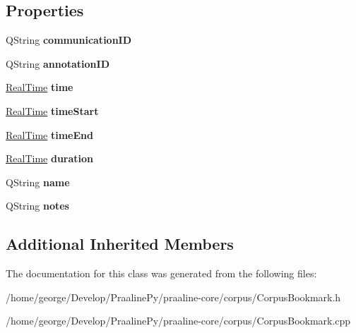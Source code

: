 \subsection*{Properties}
\begin{DoxyCompactItemize}
\item 
\mbox{\label{class_corpus_bookmark_abcd77d7fb97ddd29000918432704e12a}} 
Q\+String {\bfseries communication\+ID}
\item 
\mbox{\label{class_corpus_bookmark_a7c73ec0ea43dc8ede1cab7b6ec4c66fd}} 
Q\+String {\bfseries annotation\+ID}
\item 
\mbox{\label{class_corpus_bookmark_afdd695b8d2efd769c3812bc6536067a1}} 
\hyperlink{struct_real_time}{Real\+Time} {\bfseries time}
\item 
\mbox{\label{class_corpus_bookmark_a720543df1f873fc01f3f00ae17372492}} 
\hyperlink{struct_real_time}{Real\+Time} {\bfseries time\+Start}
\item 
\mbox{\label{class_corpus_bookmark_a9a32bab6289a02166c462a0214157eab}} 
\hyperlink{struct_real_time}{Real\+Time} {\bfseries time\+End}
\item 
\mbox{\label{class_corpus_bookmark_a48d35b110db04b3fc9a159cf3006bae6}} 
\hyperlink{struct_real_time}{Real\+Time} {\bfseries duration}
\item 
\mbox{\label{class_corpus_bookmark_a795f95dddc1b620a8bbd15a6b5fd2aae}} 
Q\+String {\bfseries name}
\item 
\mbox{\label{class_corpus_bookmark_ab12b3c805c9bf84978a3a3584e126732}} 
Q\+String {\bfseries notes}
\end{DoxyCompactItemize}
\subsection*{Additional Inherited Members}


The documentation for this class was generated from the following files\+:\begin{DoxyCompactItemize}
\item 
/home/george/\+Develop/\+Praaline\+Py/praaline-\/core/corpus/Corpus\+Bookmark.\+h\item 
/home/george/\+Develop/\+Praaline\+Py/praaline-\/core/corpus/Corpus\+Bookmark.\+cpp\end{DoxyCompactItemize}
